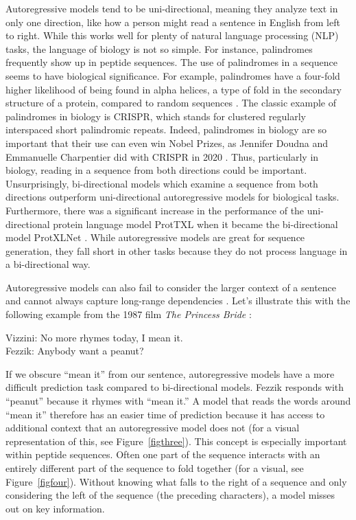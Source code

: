 \documentclass{SBCbookchapter}
\begin{document}
Autoregressive models tend to be uni-directional, meaning they analyze text in only one direction, like how a person might read a sentence in English from left to right. While this works well for plenty 
of natural language processing (NLP) tasks, the language of biology is not so simple. For instance, palindromes frequently show up in peptide sequences. The use of palindromes in a sequence seems to 
have biological significance. For example, palindromes have a four-fold higher likelihood of being found in alpha helices, a type of fold in the secondary structure of a protein, compared to random 
sequences \cite{sheari_tale_2008}. The classic example of palindromes in biology is CRISPR, which stands for clustered regularly interspaced short palindromic repeats. Indeed, palindromes in biology are 
so important that their use can even win Nobel Prizes, as Jennifer Doudna and Emmanuelle Charpentier did with CRISPR in 2020 \cite{ledford_pioneers_2020}. Thus, particularly in biology, reading in a 
sequence from both directions could be important. Unsurprisingly, bi-directional models which examine a sequence from both directions outperform uni-directional autoregressive models for biological 
tasks. Furthermore, there was a significant increase in the performance of the uni-directional protein language model ProtTXL when it became the bi-directional model ProtXLNet 
\cite{elnaggar_prottrans_2021}. While autoregressive models are great for sequence generation, they fall short in other tasks because they do not process language in a bi-directional way.

Autoregressive models can also fail to consider the larger context of a sentence and cannot always capture long-range dependencies \cite{triebe_ar-net_2019}. Let’s illustrate this with the following 
example from the 1987 film \textit{The Princess Bride} \cite{reiner_princess_1987}:

\begin{center}
Vizzini: No more rhymes today, I mean it. \\
Fezzik: Anybody want a peanut?
\end{center}

If we obscure “mean it” from our sentence, autoregressive models have a more difficult prediction task compared to bi-directional models. Fezzik responds with “peanut” because it rhymes with “mean it.” 
A model that reads the words around “mean it” therefore has an easier time of prediction because it has access to additional context that an autoregressive model does not (for a visual representation of 
this, see Figure~\ref{figthree}). This concept is especially important within peptide sequences. Often one part of the sequence interacts with an entirely different part of the sequence to fold together 
\cite{ferruz_towards_2022} (for a visual, see Figure~\ref{figfour}). Without knowing what falls to the right of a sequence and only considering the left of the sequence (the preceding characters), a 
model misses out on key information. 
\end{document}
